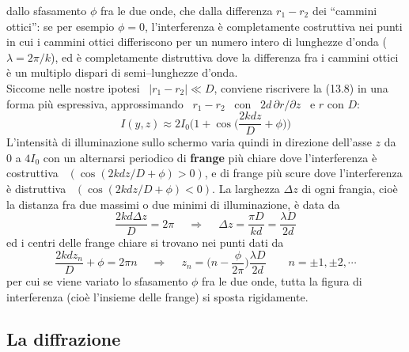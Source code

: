 dallo sfasamento $\phi$ fra le due onde, che dalla differenza $r_1-r_2$ dei
``cammini ottici'': se per esempio $\phi=0$, l'interferenza \`e completamente
costruttiva nei punti in cui i cammini ottici differiscono per un numero intero
di lunghezze d'onda ($\lambda=2\pi/k$), ed \`e completamente distruttiva dove la
differenza fra i cammini ottici \`e un multiplo dispari di semi--lunghezze
d'onda.\\
Siccome nelle nostre ipotesi \ $|r_1-r_2|\ll D$, conviene riscrivere la (13.8)
in una forma pi\`u espressiva, approssimando \ $r_1-r_2$ \ con
\ $2d\,\partial r/\partial z$ \ e $r$ con $D$:
\begin{equation}
  I(y,z)\approx2I_0\Big(1+\cos\big(\frac{2kdz}{D}+\phi\big)\Big)
  \tag{13.9}
\end{equation}
L'intensit\`a di illuminazione sullo schermo varia quindi in direzione dell'asse
$z$ da 0 a $4I_0$ con un alternarsi periodico di \textbf{frange} pi\`u chiare
dove l'interferenza \`e costruttiva \ $(\cos(2kdz/D+\phi)>0)$, e di frange pi\`u
scure dove l'interferenza \`e distruttiva \ $(\cos(2kdz/D+\phi)<0)$. La
larghezza $\Delta z$ di ogni frangia, cio\`e la distanza fra due massimi o due
minimi di illuminazione, \`e data da
\begin{equation}
  \frac{2kd\Delta z}{D}=2\pi
  \quad\ \Rightarrow\quad\ \Delta z=\frac{\pi D}{kd}=\frac{\lambda D}{2d}
  \tag{13.10}
\end{equation}
ed i centri delle frange chiare si trovano nei punti dati da
\begin{equation}
  \frac{2kdz_n}{D}+\phi=2\pi n
  \quad\ \Rightarrow\quad\ z_n=\big(n-\frac{\phi}{2\pi}\big)\frac{\lambda D}{2d}
  \qquad n=\pm1,\pm2,\cdots
  \tag{13.11}
\end{equation}
per cui se viene variato lo sfasamento $\phi$ fra le due onde, tutta la figura
di interferenza (cio\`e l'insieme delle frange) si sposta rigidamente.

\subsection{La diffrazione}

